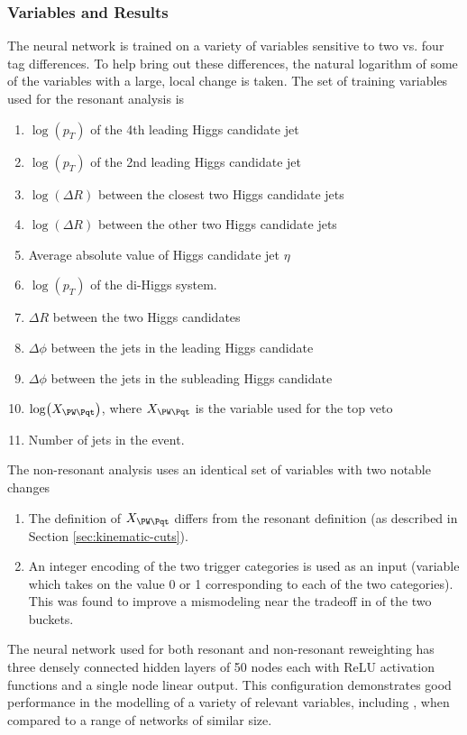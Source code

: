 \subsubsection{Variables and Results}
The neural network is trained on a variety of variables sensitive to two vs.
four tag differences. To help bring out these differences, the natural logarithm 
of some of the variables with a large, local change is taken. The 
set of training variables used for the resonant analysis is
\begin{enumerate}
	\item $\log(p_T)$ of the 4th leading Higgs candidate jet
	\item $\log(p_T)$ of the 2nd leading Higgs candidate jet
	\item $\log(\Delta R)$ between the closest two Higgs candidate jets
	\item $\log(\Delta R)$ between the other two Higgs candidate jets
	\item Average absolute value of Higgs candidate jet $\eta$
	\item $\log(p_T)$ of the di-Higgs system.
	\item $\Delta R$ between the two Higgs candidates
	\item $\Delta \phi$ between the jets in the leading Higgs candidate
	\item $\Delta \phi$ between the jets in the subleading Higgs candidate
	\item $\log(X_{\PW\Pqt})$, where $X_{\PW\Pqt}$ is the variable used for the top veto
	\item Number of jets in the event.
\end{enumerate}
The non-resonant analysis uses an identical set of variables with two notable changes
\begin{enumerate}
	\item The definition of $X_{\PW\Pqt}$ differs from the resonant definition (as described 
	in Section \ref{sec:kinematic-cuts}).
	\item An integer encoding of the two trigger categories is used as an input (variable which 
	takes on the value 0 or 1 corresponding to each of the two categories). This was found to improve
	a mismodeling near the tradeoff in \mhh of the two buckets.
\end{enumerate}

The neural network used for both resonant and non-resonant reweighting has three 
densely connected hidden layers of 50 nodes each with ReLU activation functions and a single node 
linear output. This configuration demonstrates good performance in the modelling 
of a variety of relevant variables, including \mhh, when compared to a 
range of networks of similar size.

